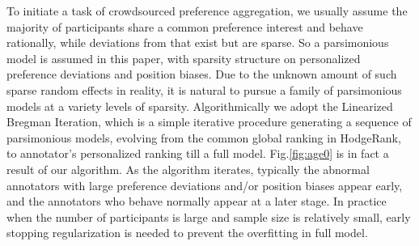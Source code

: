 \documentclass[10pt,journal,cspaper,compsoc]{IEEEtran}
\begin{document}

To initiate a task of crowdsourced preference aggregation, we usually assume the majority of participants share a common preference interest and behave rationally, while deviations from that exist but are sparse. So a parsimonious model is assumed in this paper, with sparsity structure on personalized preference deviations and position biases. Due to the unknown amount of such sparse random effects in reality, it is natural to pursue a family of parsimonious models at a variety levels of sparsity. Algorithmically we adopt the Linearized Bregman Iteration, which is a simple iterative procedure generating a sequence of parsimonious models, evolving from the common global ranking in HodgeRank, to annotator's personalized ranking till a full model. Fig.\ref{fig:age0} is in fact a result of our algorithm. As the algorithm iterates, typically the abnormal annotators with large preference deviations and/or position biases appear early, and the annotators who behave normally appear at a later stage. In practice when the number of participants is large and sample size is relatively small, early stopping regularization is needed to prevent the overfitting in full model.
\end{document}
